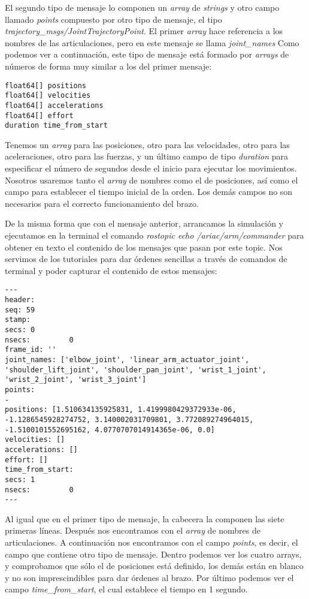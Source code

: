 El segundo tipo de mensaje lo componen un \textit{array} de \textit{strings} y otro campo llamado \textit{points} compuesto por otro tipo de mensaje, el tipo \textit{trajectory\_msgs/JointTrajectoryPoint}. El primer \textit{array} hace referencia a los nombres de las articulaciones, pero en este mensaje se llama \textit{joint\_names} Como podemos ver a continuación, este tipo de mensaje está formado por \textit{arrays} de números de forma muy similar a los del primer mensaje:
\begin{lstlisting}
float64[] positions
float64[] velocities
float64[] accelerations
float64[] effort
duration time_from_start
\end{lstlisting}
Tenemos un \textit{array} para las posiciones, otro para las velocidades, otro para las aceleraciones, otro para las fuerzas, y un último campo de tipo \textit{duration} para especificar el número de segundos desde el inicio para ejecutar los movimientos. Nosotros usaremos tanto el \textit{array} de nombres como el de posiciones, así como el campo para establecer el tiempo inicial de la orden. Los demás campos no son necesarios para el correcto funcionamiento del brazo.

De la misma forma que con el mensaje anterior, arrancamos la simulación y ejecutamos en la terminal el comando \textit{rostopic echo /ariac/arm/commander} para obtener en texto el contenido de los mensajes que pasan por este topic. Nos servimos de los tutoriales para dar órdenes sencillas a través de comandos de terminal y poder capturar el contenido de estos mensajes:
\begin{lstlisting}
---
header: 
seq: 59
stamp: 
secs: 0
nsecs:         0
frame_id: ''
joint_names: ['elbow_joint', 'linear_arm_actuator_joint', 'shoulder_lift_joint', 'shoulder_pan_joint', 'wrist_1_joint', 'wrist_2_joint', 'wrist_3_joint']
points: 
- 
positions: [1.510634135925831, 1.4199980429372933e-06, -1.1286545928274752, 3.140002031709801, 3.772089274964015, -1.5100101552695162, 4.0770707014914365e-06, 0.0]
velocities: []
accelerations: []
effort: []
time_from_start: 
secs: 1
nsecs:         0
---
\end{lstlisting}
Al igual que en el primer tipo de mensaje, la cabecera la componen las siete primeras líneas. Después nos encontramos con el \textit{array} de nombres de articulaciones. A continuación nos encontramos con el campo \textit{points}, es decir, el campo que contiene otro tipo de mensaje. Dentro podemos ver los cuatro arrays, y comprobamos que sólo el de posiciones está definido, los demás están en blanco y no son imprescindibles para dar órdenes al brazo. Por último podemos ver el campo \textit{time\_from\_start}, el cual establece el tiempo en 1 segundo.

